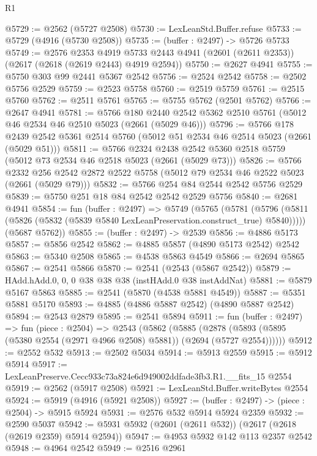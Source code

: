 \begin{lexlean}{R1}
\begin{coremodule}
@5729 := @2562 (@5727 @2508)
@5730 := LexLeanStd.Buffer.refuse
@5733 := @5729 (@4916 (@5730 @2508))
@5735 := (buffer : @2497) -> @5726 @5733
@5749 := @2576
    @2353
    @4919
    @5733
    @2443
    @4941
    (@2601 (@2611 @2353))
    (@2617 (@2618 (@2619 @2443) @4919 @2594))
@5750 := @2627 @4941
@5755 := @5750 @303 @99 @2441 @5367 @2542
@5756 := @2524 @2542
@5758 := @2502 @5756 @2529
@5759 := @2523 @5758
@5760 := @2519 @5759
@5761 := @2515 @5760
@5762 := @2511 @5761
@5765 := @5755 @5762 (@2501 @5762)
@5766 := @2647 @4941
@5781 := @5766
    @180
    @2440
    @2542
    @5362
    @2510
    @5761
    (@5012 @46 @2534 @46 @2510 @5023 (@2661 (@5029 @46)))
@5796 := @5766
    @178
    @2439
    @2542
    @5361
    @2514
    @5760
    (@5012 @51 @2534 @46 @2514 @5023 (@2661 (@5029 @51)))
@5811 := @5766
    @2324
    @2438
    @2542
    @5360
    @2518
    @5759
    (@5012 @73 @2534 @46 @2518 @5023 (@2661 (@5029 @73)))
@5826 := @5766
    @2332
    @256
    @2542
    @2872
    @2522
    @5758
    (@5012 @79 @2534 @46 @2522 @5023 (@2661 (@5029 @79)))
@5832 := @5766 @254 @84 @2544 @2542 @5756 @2529
@5839 := @5750 @251 @18 @84 @2542 @2542 @2529 @5756
@5840 := @2681 @4941
@5854 := fun (buffer : @2497) =>
  @5749
    (@5765
      (@5781 (@5796 (@5811 (@5826 (@5832 (@5839 @5840 LexLeanPreservation.construct_true) @5840)))))
      (@5687 @5762))
@5855 := (buffer : @2497) -> @2539
@5856 := @4886 @5173
@5857 := @5856 @2542
@5862 := @4885 @5857 (@4890 @5173 @2542) @2542
@5863 := @5340 @2508
@5865 := @4538 @5863 @4549
@5866 := @2694 @5865
@5867 := @2541 @5866
@5870 := @2541 (@2543 (@5867 @2542))
@5879 := HAdd.hAdd.{0, 0, 0} @38 @38 @38 (instHAdd.{0} @38 instAddNat)
@5881 := @5879 @5167 @5863
@5885 := @2541 (@5870 (@4538 @5881 @4549))
@5887 := @5351 @5881 @5170
@5893 := @4885 (@4886 @5887 @2542) (@4890 @5887 @2542)
@5894 := @2543 @2879
@5895 := @2541 @5894
@5911 := fun (buffer : @2497) =>
  fun (piece : @2504) =>
  @2543
    (@5862
      (@5885 (@2878 (@5893 (@5895 (@5380 @2554 (@2971 @4966 @2508) @5881)) (@2694 (@5727 @2554))))))
@5912 := @2552 @532
@5913 := @2502 @5034
@5914 := @5913 @2559
@5915 := @5912 @5914
@5917 := LexLeanPreserve.Cecc933c73a824e6d949002ddfade3fb3.R1.__fits_15 @2554
@5919 := @2562 (@5917 @2508)
@5921 := LexLeanStd.Buffer.writeBytes @2554
@5924 := @5919 (@4916 (@5921 @2508))
@5927 := (buffer : @2497) -> (piece : @2504) -> @5915 @5924
@5931 := @2576 @532 @5914 @5924 @2359
@5932 := @2590 @5037
@5942 := @5931 @5932 (@2601 (@2611 @532)) (@2617 (@2618 (@2619 @2359) @5914 @2594))
@5947 := @4953 @5932 @142 @113 @2357 @2542
@5948 := @4964 @2542
@5949 := @2516 @2961

\end{coremodule}
\end{lexlean}
